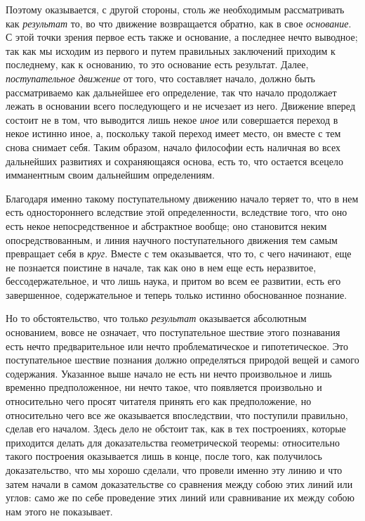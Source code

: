 Поэтому оказывается, с другой стороны, столь же необходимым рассматривать
как {\em результат} то, во что движение возвращается
обратно, как в свое {\em основание}. С этой точки
зрения первое есть также и основание, а последнее нечто выводное; так как
мы исходим из первого и путем правильных заключений приходим к последнему,
как к основанию, то это основание есть результат. Далее,
{\em поступательное движение} от того, что составляет
начало, должно быть рассматриваемо как дальнейшее его определение, так что
начало продолжает лежать в основании всего последующего и не исчезает из
него. Движение вперед состоит не в том, что выводится лишь некое
{\em иное} или совершается переход в некое истинно
иное, а, поскольку такой переход имеет место, он вместе с тем снова
снимает себя. Таким образом, начало философии есть наличная во всех
дальнейших развитиях и сохраняющаяся основа, есть то, что остается всецело
имманентным своим дальнейшим определениям.

Благодаря именно такому поступательному движению начало теряет то, что в нем
есть одностороннего вследствие этой определенности, вследствие того, что
оно есть некое непосредственное и абстрактное вообще; оно становится неким
опосредствованным, и линия научного поступательного движения тем самым
превращает себя в {\em круг}. Вместе с тем оказывается,
что то, с чего начинают, еще не познается поистине в начале, так как оно в
нем еще есть неразвитое, бессодержательное, и что лишь наука, и притом во
всем ее развитии, есть его завершенное, содержательное и теперь только
истинно обоснованное познание.

Но то обстоятельство, что только {\em результат}
оказывается абсолютным основанием, вовсе не означает, что поступательное
шествие этого познавания есть нечто предварительное или нечто
проблематическое и гипотетическое. Это поступательное шествие познания
должно определяться природой вещей и самого содержания. Указанное выше
начало не есть ни нечто произвольное и лишь временно предположенное, ни
нечто такое, что появляется произвольно и относительно чего просят читателя
принять его как предположение, но относительно чего все же оказывается
впоследствии, что поступили правильно, сделав его началом. Здесь дело не
обстоит так, как в тех построениях, которые приходится делать для
доказательства геометрической теоремы: относительно такого построения
оказывается лишь в конце, после того, как получилось доказательство, что мы
хорошо сделали, что провели именно эту линию и что затем начали в самом
доказательстве со сравнения между собою этих линий или углов: само же по
себе проведение этих линий или сравнивание их между собою нам этого не
показывает.

